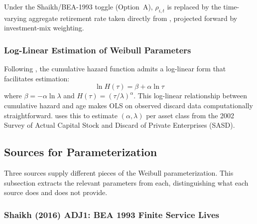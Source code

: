 Under the Shaikh/BEA-1993 toggle (Option~A), $\rho_{i,t}$ is replaced by the
time-varying aggregate retirement rate taken directly from
\citet[Appendix~6.8.II.3]{Shaikh2016}, projected forward by investment-mix
weighting.


\subsubsection{Log-Linear Estimation of Weibull Parameters}
\label{app:ret:loglinear}

Following \citet{Nomura2005}, the cumulative hazard function admits a log-linear
form that facilitates estimation:
%
\begin{equation}
    \ln H(\tau) = \beta + \alpha \ln \tau
    \label{eq:ret:loglinear}
\end{equation}
%
where $\beta = -\alpha \ln \lambda$ and
$H(\tau) = (\tau/\lambda)^{\alpha}$. This log-linear relationship between
cumulative hazard and age makes OLS on observed discard data computationally
straightforward. \citet{Nomura2005} uses this to estimate $(\alpha, \lambda)$
per asset class from the 2002 Survey of Actual Capital Stock and Discard of
Private Enterprises (SASD).


\subsection{Sources for Parameterization}
\label{app:ret:sources}

Three sources supply different pieces of the Weibull parameterization. This
subsection extracts the relevant parameters from each, distinguishing what each
source does and does not provide.


\subsubsection{Shaikh (2016) ADJ1: BEA 1993 Finite Service Lives}
\label{app:ret:src_shaikh}

